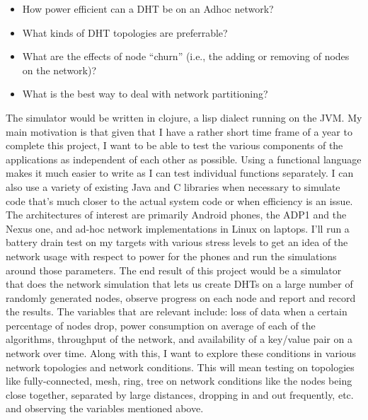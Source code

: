 \documentclass[a4paper,10pt]{article}
\newcommand{\cmt}[2]{#2}
\begin{document}
\begin{itemize}
 \item How power efficient can a DHT be on an Adhoc network?
 \item What kinds of \cmt{network}{DHT} topologies are preferrable?
 \item What are the effects of \cmt{}{node ``churn''} \cmt{}{(i.e., the adding or removing of nodes on the network)}?
 \item What is the best way to deal with network partitioning?
\end{itemize}
The simulator would be written in clojure, a lisp dialect running on the \cmt{java}{} JVM. My main motivation is that given that I have a rather short time frame of a year to complete this project, I want to be able to test the various components of the applications as independent of each other as possible. Using a functional language makes it much easier to write as I can test individual functions separately. I can also use \cmt{various}{a variety of} existing Java and C libraries when \cmt{needed}{necessary} \cmt{and}{to} simulate code that's much closer to the actual system\cmt{'s}{} code \cmt{}{or when efficiency is an issue}. The architectures \cmt{I'll be looking}{of interest are} primarily \cmt{would be} Android phones\cmt{-}{,} the ADP1 and the Nexus one\cmt{}{,} and ad-hoc network implementations in Linux \cmt{in}{on} laptops. I'll run a battery drain test on my targets with various stress levels to get an idea of the network usage with respect to power for the phones and run the simulations around those parameters.
The end result of this project would be a simulator that does the network simulation that lets us create DHTs on a \cmt{random}{large} number of \cmt{}{randomly generated} nodes, observe progress on each node and report and record the results. The variables that are relevant \cmt{are -}{include:} loss of data when a certain percentage of nodes drop, power consumption on average of each of the algorithms, throughput of the network, \cmt{}{and} availability of a key/value pair on a network over time. Along with this, I want to explore these conditions in various network topologies and network conditions. This will mean testing on topologies like fully-connected, mesh, ring, tree on network conditions like the nodes being close together, separated by large distances, dropping in and out frequently, etc. and observing the variables mentioned above.
\end{document}

